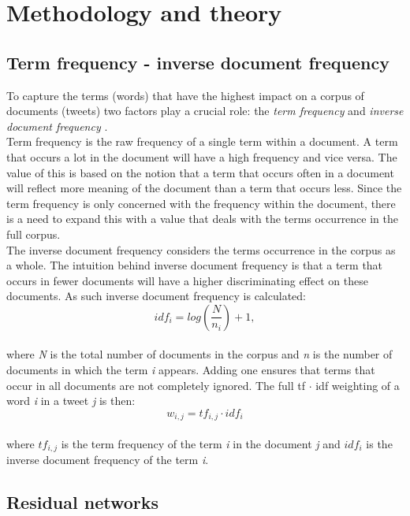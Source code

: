 \section{Methodology and theory}

\subsection{Term frequency - inverse document frequency}
To capture the terms (words) that have the highest impact on a corpus of documents (tweets) two factors play a crucial role: the \textit{term frequency} and \textit{inverse document frequency} \cite{speech}.\\
Term frequency is the raw frequency of a single term within a document. A term that occurs a lot in the document will have a high frequency and vice versa. The value of this is based on the notion that a term that occurs often in a document will reflect more meaning of the document than a term that occurs less. Since the term frequency is only concerned with the frequency within the document, there is a need to expand this with a value that deals with the terms occurrence in the full corpus.\\
The inverse document frequency considers the terms occurrence in the corpus as a whole. The intuition behind inverse document frequency is that a term that occurs in fewer documents will have a higher discriminating effect on these documents. As such inverse document frequency is calculated:\\
\begin{equation} 
id f_{i} = log \left(\dfrac{N}{n_{i}}\right)+1,
\end{equation}\\
where \textit{N} is the total number of documents in the corpus and \textit{n} is the number of documents in which the term \textit{i} appears. Adding one ensures that terms that occur in all documents are not completely ignored. The full tf $\cdot$ idf weighting of a word \textit{i} in a tweet \textit{j} is then:\\
\begin{equation} 
w_{i,j}= tf_{i,j}\cdot id f_{i}
\end{equation}\\
where $tf_{i,j}$ is the term frequency of the term \textit{i} in the document \textit{j} and $id f_{i}$ is the inverse document frequency of the term \textit{i}.

\subsection{Residual networks}


